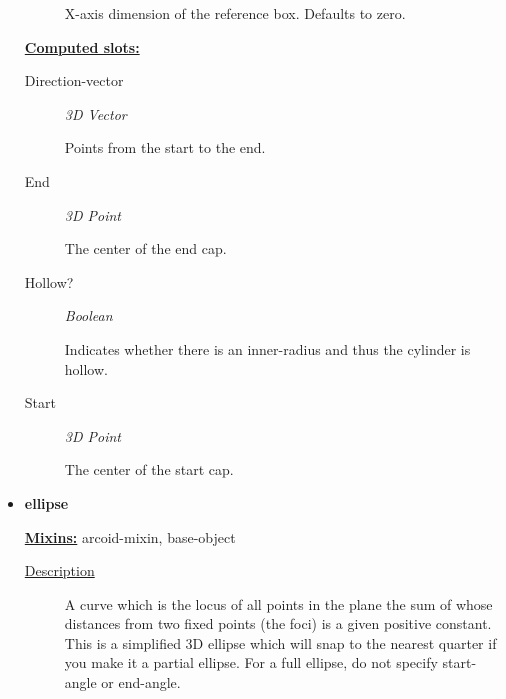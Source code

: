 \documentclass [11pt]{book}
\begin{document}
\begin{itemize}
\begin{description}
 X-axis dimension of the reference box. Defaults to zero.




\end{description}






\textbf{
\underline{Computed slots:}}

\begin{description}

\item [Direction-vector]
\emph{3D Vector}

 Points from the start to the end.




\item [End]
\emph{3D Point}

 The center of the end cap.




\item [Hollow?]
\emph{Boolean}

 Indicates whether there is an inner-radius and thus the cylinder is hollow.




\item [Start]
\emph{3D Point}

 The center of the start cap.




\end{description}







\item {}
\label{prim:ellipse}
\textbf{ellipse}


\textbf{
\underline{Mixins:}} arcoid-mixin, base-object





\begin{description}

\item [
\underline{Description}]


A curve which is the locus of all points in the plane 
the sum of whose distances from two fixed points (the foci) is a given positive constant.
This is a simplified 3D ellipse which will snap to the nearest quarter if you make it a 
partial ellipse. For a full ellipse, do not specify start-angle or end-angle.




\end{description}
\end{itemize}
\end{document}
